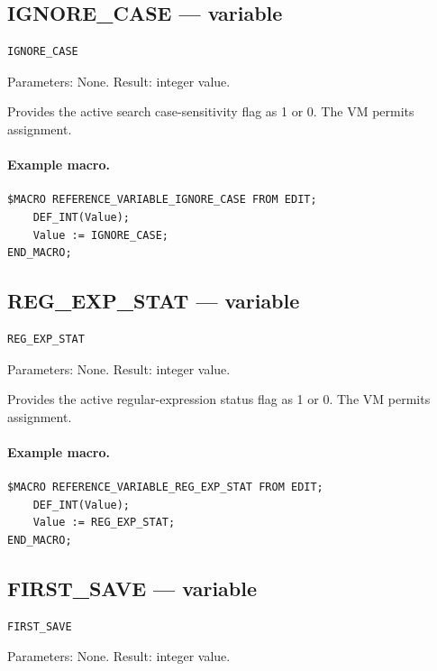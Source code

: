 \documentclass[a4paper,10pt,twoside,openany]{book}
\begin{document}
\label{prim:variable-ignore-case}
\subsection*{IGNORE\_CASE --- variable}
\begin{verbatim}
IGNORE_CASE
\end{verbatim}
Parameters: None. Result: integer value.

Provides the active search case-sensitivity flag as 1 or 0. The VM permits assignment.

\paragraph{Example macro.}
\begin{verbatim}
$MACRO REFERENCE_VARIABLE_IGNORE_CASE FROM EDIT;
    DEF_INT(Value);
    Value := IGNORE_CASE;
END_MACRO;
\end{verbatim}

\label{prim:variable-reg-exp-stat}
\subsection*{REG\_EXP\_STAT --- variable}
\begin{verbatim}
REG_EXP_STAT
\end{verbatim}
Parameters: None. Result: integer value.

Provides the active regular-expression status flag as 1 or 0. The VM permits assignment.

\paragraph{Example macro.}
\begin{verbatim}
$MACRO REFERENCE_VARIABLE_REG_EXP_STAT FROM EDIT;
    DEF_INT(Value);
    Value := REG_EXP_STAT;
END_MACRO;
\end{verbatim}

\label{prim:variable-first-save}
\subsection*{FIRST\_SAVE --- variable}
\begin{verbatim}
FIRST_SAVE
\end{verbatim}
Parameters: None. Result: integer value.
\end{document}
